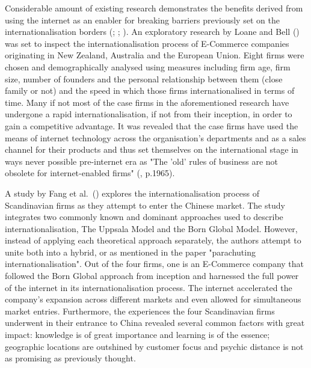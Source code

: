 \documentclass[12pt,a4paper]{article}
\begin{document}
Considerable amount of existing research demonstrates the benefits derived from using the internet as an enabler for breaking barriers previously set on the internationalisation borders (\cite{chaiAncientModernCross2004}; \cite{shneorInternetenabledInternationalizationProcess2008}; \cite{areniusRapidInternationalisationEnabled2005}). %
An exploratory research by Loane and Bell (\citeyear{loaneCrossnationalComparisonInternationalisation2002}) was set to inspect the internationalisation process of E-Commerce companies originating in New Zealand, Australia and the European Union. Eight firms were chosen and demographically analysed using measures including firm age, firm size, number of founders and the personal relationship between them (close family or not) and the speed in which those firms internationalised in terms of time. Many if not most of the case firms in the aforementioned research have undergone a rapid internationalisation, if not from their inception, in order to gain a competitive advantage. It was revealed that the case firms have used the means of internet technology across the organisation's departments and as a sales channel for their products and thus set themselves on the international stage in ways never possible pre-internet era as "The 'old' rules of business are not obsolete for internet-enabled firms" (\cite{loaneCrossnationalComparisonInternationalisation2002}, p.1965).   \par 
A study by Fang et al.\ (\citeyear{fangParachutingInternationalizationStudy2017}) explores the internationalisation process of Scandinavian firms as they attempt to enter the Chinese market. The study integrates two commonly known and dominant approaches used to describe internationalisation, The Uppsala Model and the Born Global Model. However, instead of applying each theoretical approach separately, the authors attempt to unite both into a hybrid, or as mentioned in the paper "parachuting internationalisation". Out of the four firms, one is an E-Commerce company that followed the Born Global approach from inception and harnessed the full power of the internet in its internationalisation process. The internet accelerated the company's expansion across different markets and even allowed for simultaneous market entries. Furthermore, the experiences the four Scandinavian firms underwent in their entrance to China revealed several common factors with great impact: knowledge is of great importance and learning is of the essence; geographic locations are outshined by customer focus and psychic distance is not as promising as previously thought. \par
\end{document}
